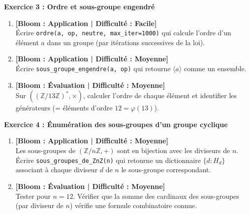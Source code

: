 \vspace{0.3cm}

\noindent\textbf{Exercice 3 : Ordre et sous-groupe engendré}
\begin{enumerate}
    \item \textbf{[Bloom : Application | Difficulté : Facile]} \\
    Écrire \texttt{ordre(a, op, neutre, max\_iter=1000)} qui calcule l'ordre d'un élément $a$ dans un groupe (par itérations successives de la loi).
    \item \textbf{[Bloom : Application | Difficulté : Moyenne]} \\
    Écrire \texttt{sous\_groupe\_engendre(a, op)} qui retourne $\langle a \rangle$ comme un ensemble.
    \item \textbf{[Bloom : Évaluation | Difficulté : Moyenne]} \\
    Sur $((\mathbb{Z}/13\mathbb{Z})^*, \times)$, calculer l'ordre de chaque élément et identifier les générateurs (= éléments d'ordre $12 = \varphi(13)$).
\end{enumerate}

\vspace{0.3cm}

\noindent\textbf{Exercice 4 : Énumération des sous-groupes d'un groupe cyclique}
\begin{enumerate}
    \item \textbf{[Bloom : Application | Difficulté : Moyenne]} \\
    Les sous-groupes de $(\mathbb{Z}/n\mathbb{Z}, +)$ sont en bijection avec les diviseurs de $n$. Écrire \texttt{sous\_groupes\_de\_ZnZ(n)} qui retourne un dictionnaire $\{d : H_d\}$ associant à chaque diviseur $d$ de $n$ le sous-groupe correspondant.
    \item \textbf{[Bloom : Évaluation | Difficulté : Moyenne]} \\
    Tester pour $n = 12$. Vérifier que la somme des cardinaux des sous-groupes (par diviseur de $n$) vérifie une formule combinatoire connue.
\end{enumerate}

\vspace{0.3cm}


